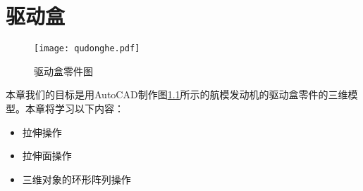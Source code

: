 \chapter{驱动盒}
\begin{figure}[htbp]
\centering
\texttt{[image: qudonghe.pdf]}
\caption{驱动盒零件图}\label{fig:qudonghe}
\end{figure}
本章我们的目标是用AutoCAD制作图\ref{fig:qudonghe}所示的航模发动机的驱动盒零件的三维模型。本章将学习以下内容：
\begin{itemize}
	\item 拉伸操作
	\item 拉伸面操作
	\item 三维对象的环形阵列操作

\end{itemize}
\endinput